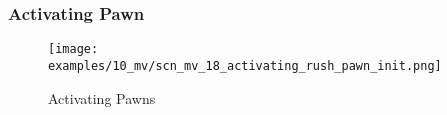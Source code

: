 





\clearpage %

\subsubsection*{Activating Pawn}

\vspace*{-1.4\baselineskip}
\noindent
\begin{figure}[!h]
\texttt{[image: examples/10\_mv/scn\_mv\_18\_activating\_rush\_pawn\_init.png]}
\vspace*{-1.3\baselineskip}
\caption{Activating Pawns}
\label{fig:scn_mv_18_activating_rush_pawn_init}
\end{figure}

